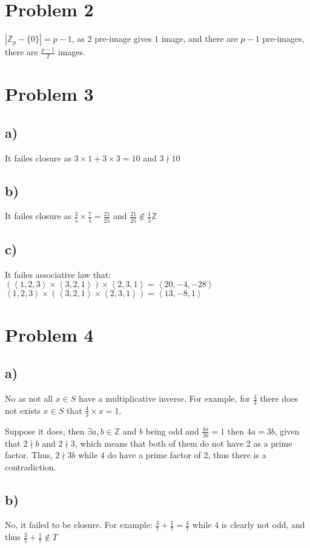 \documentclass{article}
\begin{document}
\section*{Problem 2}
\(|\mathbb{Z}_p-\{0\}|=p-1\), as \(2\) pre-image gives \(1\) image, and there are \(p-1\) pre-images, there are \(\frac{p-1}{2}\) images.
\section*{Problem 3}
\subsection*{a)}
It failes closure as \(3\times 1 + 3\times 3=10\) and \(3\nmid 10\)
\subsection*{b)}
It failes closure as \(\displaystyle \frac{3}{5}\times \frac{7}{5}= \frac{21}{25}\) and \(\displaystyle \frac{21}{25}\notin \frac{1}{5}\mathbb{Z}\)
\subsection*{c)}
It failes associative law that:\\
\(\left(\left<1,2,3\right>\times\left<3,2,1\right>\right)\times\left<2,3,1\right>=\left<20,-4,-28\right>\)\\
\(\left<1,2,3\right>\times \left(\left<3,2,1\right>\times \left<2,3,1\right>\right)=\left<13,-8,1\right>\)
\section*{Problem 4}
\subsection*{a)}
No as not all \(x\in S\) have a multiplicative inverse. For example, for \(\frac{4}{3}\)
there does not exists \(x\in S\) that \(\frac{4}{3}\times x = 1\).

Suppose it does, then  \(\exists a,b\in \mathbb{Z}\) and \(b\) being odd and 
\(\frac{4a}{3b}=1\) then \(4a=3b\), given that \(2\nmid b\) and \(2\nmid 3\), which means that both of them do not
have 2 as a prime factor. Thus, \(2\nmid 3b\) while \(4\) do have a prime factor of 2, thus there is a contradiction.

\subsection*{b)}
No, it failed to be closure. For example: \(\frac{3}{7}+\frac{1}{7}=\frac{4}{7}\) while \(4\) is clearly not odd, and thus \(\frac{3}{7}+\frac{1}{7}\notin T\)
\end{document}
